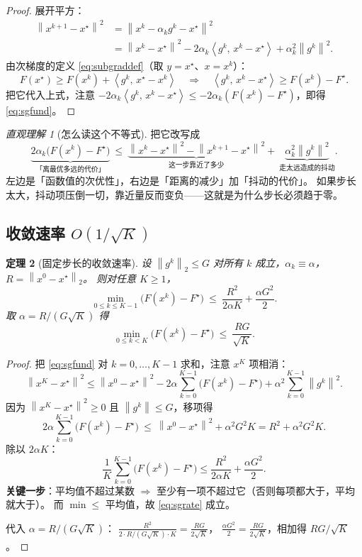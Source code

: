 \documentclass[11pt,a4paper,UTF8]{ctexart}
\theoremstyle{plain}
\newtheorem{theorem}{定理}[section]
\theoremstyle{definition}
\theoremstyle{remark}
\newtheorem{intuition}[theorem]{直观理解}
\newcommand{\norm}[1]{\left\lVert #1 \right\rVert}
\newcommand{\inner}[2]{\left\langle #1,\, #2 \right\rangle}
\begin{document}
\begin{proof}
展开平方：
\begin{align*}
\norm{x^{k+1}-x^\star}^2
&=\norm{x^k-\alpha_kg^k-x^\star}^2\\
&=\norm{x^k-x^\star}^2-2\alpha_k\inner{g^k}{x^k-x^\star}+\alpha_k^2\norm{g^k}^2 .
\end{align*}
由次梯度的定义 \eqref{eq:subgraddef}（取 $y=x^\star$、$x=x^k$）：
\[
F(x^\star)\ge F(x^k)+\inner{g^k}{x^\star-x^k}
\quad\Longrightarrow\quad
\inner{g^k}{x^k-x^\star}\ge F(x^k)-F^\star .
\]
把它代入上式，注意 $-2\alpha_k\inner{g^k}{x^k-x^\star}\le-2\alpha_k(F(x^k)-F^\star)$，即得 \eqref{eq:sgfund}。
\end{proof}

\begin{intuition}[怎么读这个不等式]
把它改写成
\[
\underbrace{2\alpha_k\bigl(F(x^k)-F^\star\bigr)}_{\text{「离最优多远的代价」}}
\ \le\
\underbrace{\norm{x^k-x^\star}^2-\norm{x^{k+1}-x^\star}^2}_{\text{这一步靠近了多少}}
+\ \underbrace{\alpha_k^2\norm{g^k}^2}_{\text{走太远造成的抖动}} .
\]
左边是「函数值的次优性」，右边是「距离的减少」加「抖动的代价」。
如果步长太大，抖动项压倒一切，靠近量反而变负——这就是为什么步长必须趋于零。
\end{intuition}

\subsection{收敛速率 $O(1/\sqrt{K})$}

\begin{theorem}[固定步长的收敛速率]\label{thm:sgfixed}
设 $\norm{g^k}_2\le G$ 对所有 $k$ 成立，$\alpha_k\equiv\alpha$，$R=\norm{x^0-x^\star}_2$。
则对任意 $K\ge1$，
\begin{equation}
\min_{0\le k\le K-1}\bigl(F(x^k)-F^\star\bigr)
\ \le\ \frac{R^2}{2\alpha K}+\frac{\alpha G^2}{2} .
\label{eq:sgrate}
\end{equation}
取 $\alpha=R/(G\sqrt K)$ 得
\[
\min_{0\le k<K}\bigl(F(x^k)-F^\star\bigr)\ \le\ \frac{RG}{\sqrt K}.
\]
\end{theorem}

\begin{proof}
把 \eqref{eq:sgfund} 对 $k=0,\dots,K-1$ 求和，注意 $x^K$ 项相消：
\[
\norm{x^K-x^\star}^2
\le\norm{x^0-x^\star}^2-2\alpha\sum_{k=0}^{K-1}\bigl(F(x^k)-F^\star\bigr)+\alpha^2\sum_{k=0}^{K-1}\norm{g^k}^2 .
\]
因为 $\norm{x^K-x^\star}^2\ge0$ 且 $\norm{g^k}\le G$，移项得
\[
2\alpha\sum_{k=0}^{K-1}\bigl(F(x^k)-F^\star\bigr)
\ \le\ \norm{x^0-x^\star}^2+\alpha^2G^2K=R^2+\alpha^2G^2K .
\]
除以 $2\alpha K$：
\[
\frac1K\sum_{k=0}^{K-1}\bigl(F(x^k)-F^\star\bigr)\le\frac{R^2}{2\alpha K}+\frac{\alpha G^2}{2}.
\]
\textbf{关键一步}：平均值不超过某数 $\Rightarrow$ 至少有一项不超过它（否则每项都大于，平均就大于）。
而 $\min\le$ 平均值，故 \eqref{eq:sgrate} 成立。

代入 $\alpha=R/(G\sqrt K)$：
$\frac{R^2}{2\cdot R/(G\sqrt K)\cdot K}=\frac{RG}{2\sqrt K}$，
$\frac{\alpha G^2}{2}=\frac{RG}{2\sqrt K}$，相加得 $RG/\sqrt K$。
\end{proof}
\end{document}
